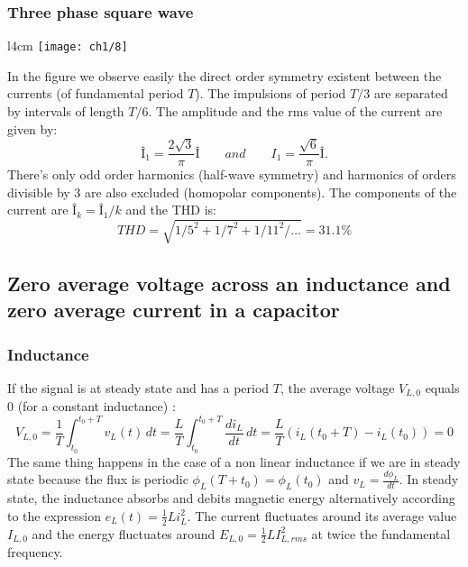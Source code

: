 		\subsubsection{Three phase square wave}
			\begin{wrapfigure}[9]{l}{4cm}
			\vspace{-5mm}
			\texttt{[image: ch1/8]}
			\end{wrapfigure}		
			In the figure we observe easily the direct order symmetry existent between the currents (of fundamental period $T$). The impulsions of period $T/3$ are separated by intervals of length $T/6$. The amplitude and the rms value of the current are given by:
			\begin{equation}
				Î_{1} = \frac{2\sqrt{3}}{\pi} Î \qquad and \qquad I_1 = \frac{\sqrt{6}}{\pi} Î.
			\end{equation}
			There's only odd order harmonics (half-wave symmetry) and harmonics of orders divisible by 3 are also excluded (homopolar components). The components of the current are $Î _k = Î_1/k$ and the THD is:
			\begin{equation}
				THD = \sqrt{1/5^2 + 1/7^2 + 1/11^2 / \dots} = 31.1\%
			\end{equation}
			
	\subsection{Zero average voltage across an inductance and zero average current in a capacitor}
		\subsubsection{Inductance}
		If the signal is at steady state and has a period $T$, the average voltage $V_{L,0}$ equals 0 (for a constant inductance) :
			\begin{equation}
				V_{L,0} = \frac{1}{T}\int _{t_0}^{t_0+T} v_L (t)\, dt = \frac{L}{T}\int _{t_0}^{t_0+T} \frac{di_L}{dt}\, dt = \frac{L}{T}\left(i_L(t_0 + T) - i_L(t_0)\right) = 0
			\end{equation}
		The same thing happens in the case of a non linear inductance if we are in steady state because the flux is periodic $\phi _L(T+t_0) = \phi _L (t_0)$ and $v_L = \frac{d\phi _L}{dt}$. In steady state, the inductance absorbs and debits magnetic energy alternatively according to the expression $e_L(t) = \frac{1}{2} Li_L^2$. The current fluctuates around its average value $I_{L,0}$ and the energy fluctuates around $E_{L,0}=\frac{1}{2} L I_{L,rms}^2$ at twice the fundamental frequency. 
			
